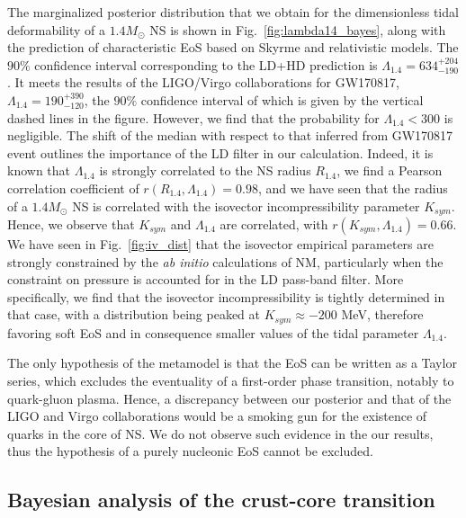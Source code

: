 The marginalized posterior distribution that we obtain for the dimensionless 
tidal deformability of a $1.4M_\odot$ NS is shown in 
Fig.~\ref{fig:lambda14_bayes}, along with the prediction of characteristic EoS
based on Skyrme and relativistic models. The $90\%$ confidence interval
corresponding to the LD+HD prediction is $\Lambda_{1.4}=634_{-190}^{+204}$. It 
meets the results of the LIGO/Virgo collaborations for GW170817, 
$\Lambda_{1.4}=190_{-120}^{+390}$, the $90\%$ confidence interval of which is 
given by the vertical dashed lines in the figure. 
However, we find that the probability for $\Lambda_{1.4} < 300$ is 
negligible. The shift of the median with respect to that inferred from
GW170817 event outlines the importance of the LD filter in our calculation.
Indeed, it is known that $\Lambda_{1.4}$ is strongly correlated to the NS
radius $R_{1.4}$, we find a Pearson correlation coefficient of $r(R_{1.4},
\Lambda_{1.4})=0.98$, and we have seen that the radius of a $1.4M_\odot$ NS is 
correlated with the isovector incompressibility parameter $K_{sym}$. Hence, 
we observe that $K_{sym}$ and $\Lambda_{1.4}$ are correlated, with
$r(K_{sym},\Lambda_{1.4}) = 0.66$. We have seen in Fig.~\ref{fig:iv_dist} that 
the isovector empirical parameters are strongly constrained by 
the \textit{ab initio} calculations of NM, particularly when the constraint on 
pressure is accounted for in the LD pass-band filter. 
More specifically, we find that the 
isovector incompressibility is tightly determined in that case, with a 
distribution being peaked at $K_{sym} \approx -200$ MeV, therefore favoring 
soft EoS and in consequence smaller values of the tidal parameter 
$\Lambda_{1.4}$.
%

{The only hypothesis of the metamodel is that the EoS can be
  written as a Taylor series, which excludes the eventuality of a first-order 
  phase transition, notably to quark-gluon plasma.
Hence, a discrepancy between our posterior and that of the
LIGO and Virgo collaborations would be a smoking gun for the existence of
quarks in the core of NS. We do not observe such evidence in the our results, 
thus the hypothesis of a purely nucleonic EoS cannot be excluded.}

\subsection{Bayesian analysis of the crust-core
transition}\label{subsec:cc_bayes}

